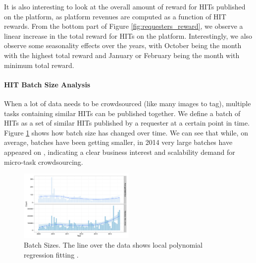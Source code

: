 It is also interesting to look at the overall amount of reward for HITs  published on the platform, as platform revenues are computed as a function of HIT rewards. From the bottom part of Figure \ref{fig:requesters_reward}, we  observe a linear increase in the total reward for HITs on the platform. Interestingly, we also observe some seasonality effects over the years, with October being the month with the highest total reward and January or February being the month with minimum total reward.


\paragraph{HIT Batch Size Analysis}
When a lot of data needs to be crowdsourced (like many images to tag), multiple  tasks containing similar HITs can be published together. We define a batch of HITs as a set of similar HITs published by a requester at a certain point in time. Figure \ref{fig:batch_size} shows how batch size has changed over time.
We can see that while, on average, batches have been getting smaller, in 2014 very large batches have appeared on \amt{}, indicating a clear business interest and scalability demand for micro-task crowdsourcing.

\begin{figure}[tb]
	\centering
		\includegraphics[width=0.5\textwidth]{figures/batch_size}
	\caption{Batch Sizes. The line over the data shows local polynomial regression fitting \cite{cleveland1992local}.}
	\label{fig:batch_size}
\end{figure}


